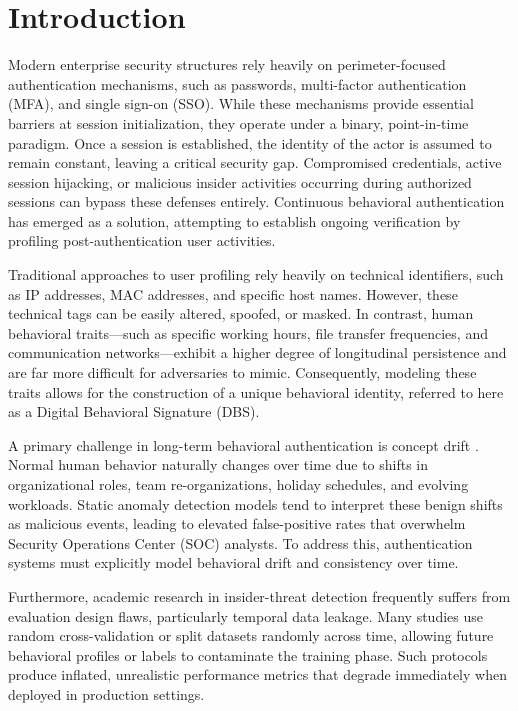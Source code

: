 \documentclass[pdflatex,sn-mathphys-num]{sn-jnl}
\theoremstyle{thmstyleone}
\theoremstyle{thmstyletwo}
\theoremstyle{thmstylethree}
\begin{document}

\maketitle

\section{Introduction}\label{sec1}
Modern enterprise security structures rely heavily on perimeter-focused authentication mechanisms, such as passwords, multi-factor authentication (MFA), and single sign-on (SSO). While these mechanisms provide essential barriers at session initialization, they operate under a binary, point-in-time paradigm. Once a session is established, the identity of the actor is assumed to remain constant, leaving a critical security gap. Compromised credentials, active session hijacking, or malicious insider activities occurring during authorized sessions can bypass these defenses entirely. Continuous behavioral authentication has emerged as a solution, attempting to establish ongoing verification by profiling post-authentication user activities.

Traditional approaches to user profiling rely heavily on technical identifiers, such as IP addresses, MAC addresses, and specific host names. However, these technical tags can be easily altered, spoofed, or masked. In contrast, human behavioral traits---such as specific working hours, file transfer frequencies, and communication networks---exhibit a higher degree of longitudinal persistence and are far more difficult for adversaries to mimic. Consequently, modeling these traits allows for the construction of a unique behavioral identity, referred to here as a Digital Behavioral Signature (DBS).

A primary challenge in long-term behavioral authentication is concept drift \cite{gama2014survey}. Normal human behavior naturally changes over time due to shifts in organizational roles, team re-organizations, holiday schedules, and evolving workloads. Static anomaly detection models tend to interpret these benign shifts as malicious events, leading to elevated false-positive rates that overwhelm Security Operations Center (SOC) analysts. To address this, authentication systems must explicitly model behavioral drift and consistency over time.

Furthermore, academic research in insider-threat detection frequently suffers from evaluation design flaws, particularly temporal data leakage. Many studies use random cross-validation or split datasets randomly across time, allowing future behavioral profiles or labels to contaminate the training phase. Such protocols produce inflated, unrealistic performance metrics that degrade immediately when deployed in production settings.
\end{document}

